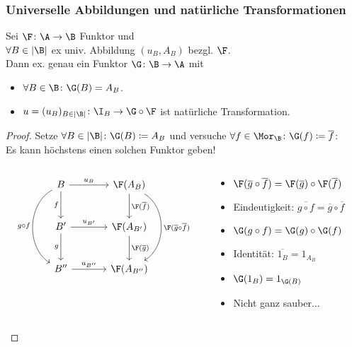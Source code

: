 \begin{frame}[fragile]
  \frametitle{Universelle Abbildungen und natürliche Transformationen}
  \begin{thm*}
    Sei $\F \colon \A \to \B$ Funktor und \\
    $\forall B \in |\B|$ ex univ. Abbildung $(u_B, A_B)$ bezgl. $\F$. \\
    Dann ex. genau ein Funktor $\G \colon \B \to \A$ mit
    \begin{itemize}
      \item $\forall B \in \B \colon \G(B) = A_B$.
      \item $u = (u_B)_{B \in |\B|} \colon \I_B \to \G \circ \F$ ist natürliche Transformation.
    \end{itemize}
  \end{thm*}

  \begin{proof}
    Setze $\forall B \in |\B| \colon \G(B) \coloneqq A_B$ und versuche $\forall f \in \Mor_\B \colon \G(f) \coloneqq \overline f$:\\
    Es kann h\"ochstens einen solchen Funktor geben!
    \vspace{1em}
    \pause
    \begin{columns}
      \begin{column}{0.5\textwidth}
    $$
        \begin{tikzcd}[column sep=3.5em,row sep=2.5em]
          B \arrow[r,"u_B"] \arrow[d,"f"'] \arrow[dd,"g \circ f"',bend right=60]    & \F(A_B)    \arrow[d,"\F(\overline f)"] \arrow[dd, bend left=60, "\F(\overline g \circ \overline f)"] 
      \\ 
      B'\arrow[r,"u_{B'}"] \arrow[d,"g"'] & \F(A_{B'}) \arrow[d ,"\F(\overline g)"] \\
      B''\arrow[r,"u_{B''}"]              & \F(A_{B''}) 
    \end{tikzcd}
    $$
      \end{column}
      \pause
      \begin{column}{0.5\textwidth}
        \begin{itemize}
          \item<+-> $\F(\overline g \circ \overline f) = \F(\overline g) \circ \F(\overline f)$
          \item<+-> Eindeutigkeit: $\overline{g \circ f} = \overline g \circ \overline f $
          \item<+-> $\G(g \circ f) = \G( g ) \circ \G( f) $
          \item<+-> Identit\"at: $\overline{1_B} = 1_{A_B}$
          \item<+-> $\G(1_B) = 1_{\G(B)}$ 
          \item<+-> Nicht ganz sauber... \qedhere
        \end{itemize}
      \end{column}
    \end{columns}
  \end{proof}
  \vspace{0.25em}
\end{frame}

